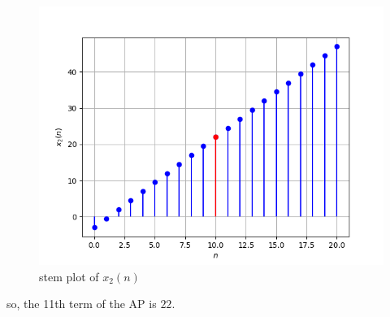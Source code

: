 \documentclass[journal,12pt,twocolumn]{IEEEtran}
\theoremstyle{remark}
\begin{document}
\begin{enumerate}
\begin{figure}[h!]
    \centering
    \includegraphics[width=\columnwidth]{figs/plot2.png}
    \caption{stem plot of $x_2(n)$}
    \label{fig:2}
\end{figure}
so, the 11th term of the AP is $22$.
\end{enumerate}
\end{document}
